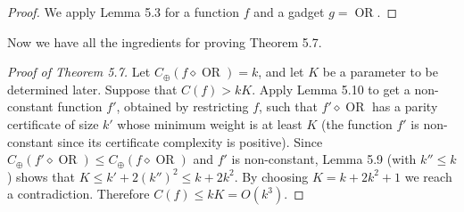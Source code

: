 \documentclass[10pt,a4paper]{article}
\newcommand{\comp}{\diamond}
\newcommand{\OR}{\operatorname{OR}}
\begin{document}
\begin{proof}
We apply Lemma 5.3 for a function $f$ and a gadget $g=\OR$.
\end{proof}
Now we have all the ingredients for proving Theorem 5.7.
\begin{proof}[Proof of Theorem 5.7]
Let $C_\oplus(f\comp\OR)=k$, and let $K$ be a parameter to be determined later. Suppose that $C(f)>kK$. Apply Lemma 5.10 to get a non-constant function $f'$, obtained by restricting $f$, such that $f'\comp\OR$ has a parity certificate of size $k'$ whose minimum weight is at least $K$ (the function $f'$ is non-constant since its certificate complexity is positive). Since $C_\oplus(f'\comp\OR)\le C_\oplus(f\comp\OR)$ and $f'$ is non-constant, Lemma 5.9 (with $k''\le k$) shows that $K\le k'+2(k'')^2\le k+2k^2$. By choosing $K=k+2k^2+1$ we reach a contradiction. Therefore $C(f)\le kK=O(k^3)$.
\end{proof}
\end{document}
